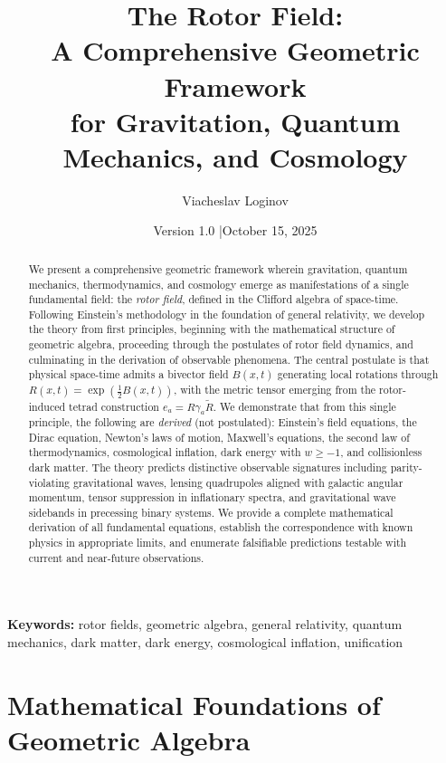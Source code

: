 \documentclass[11pt,a4paper]{article}
\title{\textbf{The Rotor Field:\\
A Comprehensive Geometric Framework\\
for Gravitation, Quantum Mechanics, and Cosmology}}
\author[1]{Viacheslav Loginov}
\affil[1]{Kyiv, Ukraine\\ \texttt{barthez.slavik@gmail.com}}
\date{\small Version 1.0 \quad|\quad October 15, 2025}
\numberwithin{equation}{section}
\theoremstyle{plain}
\theoremstyle{definition}
\theoremstyle{remark}
\newcommand{\rev}[1]{\widetilde{#1}}       %
\begin{document}
\maketitle

\begin{abstract}
\noindent
We present a comprehensive geometric framework wherein gravitation, quantum mechanics, thermodynamics, and cosmology emerge as manifestations of a single fundamental field: the \emph{rotor field}, defined in the Clifford algebra of space-time. Following Einstein's methodology in the foundation of general relativity, we develop the theory from first principles, beginning with the mathematical structure of geometric algebra, proceeding through the postulates of rotor field dynamics, and culminating in the derivation of observable phenomena. The central postulate is that physical space-time admits a bivector field $B(x,t)$ generating local rotations through $R(x,t) = \exp(\frac{1}{2}B(x,t))$, with the metric tensor emerging from the rotor-induced tetrad construction $e_a = R\gamma_a\rev{R}$. We demonstrate that from this single principle, the following are \emph{derived} (not postulated): Einstein's field equations, the Dirac equation, Newton's laws of motion, Maxwell's equations, the second law of thermodynamics, cosmological inflation, dark energy with $w \geq -1$, and collisionless dark matter. The theory predicts distinctive observable signatures including parity-violating gravitational waves, lensing quadrupoles aligned with galactic angular momentum, tensor suppression in inflationary spectra, and gravitational wave sidebands in precessing binary systems. We provide a complete mathematical derivation of all fundamental equations, establish the correspondence with known physics in appropriate limits, and enumerate falsifiable predictions testable with current and near-future observations.
\end{abstract}

\noindent\textbf{Keywords:} rotor fields, geometric algebra, general relativity, quantum mechanics, dark matter, dark energy, cosmological inflation, unification

\tableofcontents
\newpage


\section{Mathematical Foundations of Geometric Algebra}
\label{sec:math-foundations}
\end{document}
